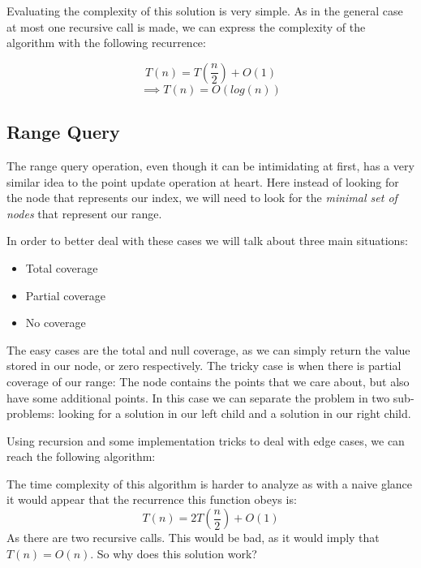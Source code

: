 \documentclass{article}
\begin{document}
Evaluating the complexity of this solution is very simple. As in the general case at most one recursive call is made, we can express the complexity of the algorithm with the following recurrence:

$$T(n) = T\left(\frac{n}{2}\right) + O(1)$$
$$\implies T(n) = O(log(n))$$

\subsection{Range Query}

The range query operation, even though it can be intimidating at first, has a very similar idea to the point update operation at heart. Here instead of looking for the node that represents our index, we will need to look for the \textit{minimal set of nodes} that represent our range.

In order to better deal with these cases we will talk about three main situations:
\begin{itemize}
	\item Total coverage
	\item Partial coverage
	\item No coverage
\end{itemize}

The easy cases are the total and null coverage, as we can simply return the value stored in our node, or zero respectively. The tricky case is when there is partial coverage of our range: The node contains the points that we care about, but also have some additional points. In this case we can separate the problem in two sub-problems: looking for a solution in our left child and a solution in our right child. 

Using recursion and some implementation tricks to deal with edge cases, we can reach the following algorithm:

\begin{algorithm}[H]
	\SetAlgoNoLine
	\SetAlgoNoEnd
\end{algorithm}

The time complexity of this algorithm is harder to analyze as with a naive glance it would appear that the recurrence this function obeys is:
$$T(n) = 2T\left(\frac{n}{2}\right) + O(1)$$
As there are two recursive calls. This would be bad, as it would imply that $T(n) = O(n)$. So why does this solution work?
\end{document}
